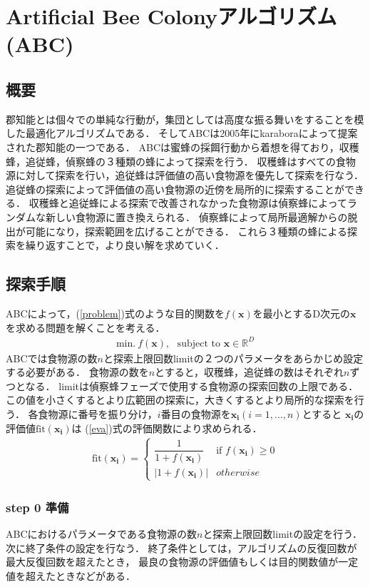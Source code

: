 \section{Artificial Bee Colonyアルゴリズム(ABC)}
\subsection{概要}
郡知能とは個々での単純な行動が，集団としては高度な振る舞いをすることを模した最適化アルゴリズムである．
そしてABCは2005年にkaraboraによって提案された郡知能の一つである\cite{abc}．
ABCは蜜蜂の採餌行動から着想を得ており，収穫蜂，追従蜂，偵察蜂の３種類の蜂によって探索を行う．
収穫蜂はすべての食物源に対して探索を行い，追従蜂は評価値の高い食物源を優先して探索を行なう．
追従蜂の探索によって評価値の高い食物源の近傍を局所的に探索することができる．
収穫蜂と追従蜂による探索で改善されなかった食物源は偵察蜂によってランダムな新しい食物源に置き換えられる．
偵察蜂によって局所最適解からの脱出が可能になり，探索範囲を広げることができる．
これら３種類の蜂による探索を繰り返すことで，より良い解を求めていく．
\subsection{探索手順}
ABCによって，(\ref{problem})式のような目的関数を$f(\boldsymbol{x})$を最小とするD次元の$\boldsymbol{x}$を求める問題を解くことを考える．
\begin{align}
    \label{problem}
\text{min}.~f(\boldsymbol{x}), \text{~~subject to } \boldsymbol{x} \in \mathbb{R} ^D
\end{align}
ABCでは食物源の数$n$と探索上限回数limitの２つのパラメータをあらかじめ設定する必要がある．
食物源の数を$n$とすると，収穫蜂，追従蜂の数はそれぞれ$n$ずつとなる．
limitは偵察蜂フェーズで使用する食物源の探索回数の上限である．
この値を小さくするとより広範囲の探索に，大きくするとより局所的な探索を行う．
各食物源に番号を振り分け，$i$番目の食物源を$\boldsymbol{x_{i}}(i = 1,...,n)$とすると
$\boldsymbol{x_{i}}$の評価値$\mathrm{fit}(\boldsymbol{x_{i}})$は
(\ref{eva})式の評価関数により求められる．
\begin{align}
    \label{eva} 
    \mathrm{fit}(\boldsymbol{x_{i}}) =
    \begin{cases}
    \dfrac{1}{1+f(\boldsymbol{x_{i}})} & \text{if } f(\boldsymbol{x_{i}}) \geq 0   \\
    \left\lvert1+f(\boldsymbol{x_{i}})\right\rvert & otherwise
    \end{cases}
\end{align}
\subsubsection*{step 0 準備}
ABCにおけるパラメータである食物源の数$n$と探索上限回数limitの設定を行う．次に終了条件の設定を行なう．
終了条件としては，アルゴリズムの反復回数が最大反復回数を超えたとき，
最良の食物源の評価値もしくは目的関数値が一定値を超えたときなどがある．
